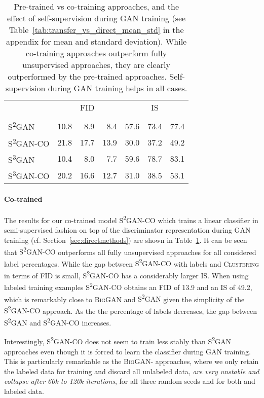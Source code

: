 \documentclass{article}
\newcommand{\cotrainSS}{\textsc{S\textsuperscript{2}GAN-CO}}
\newcommand{\cotrainSSS}{\textsc{S\textsuperscript{3}GAN-CO}}
\newcommand{\tranSS}{\textsc{S\textsuperscript{2}GAN}}
\newcommand{\tranSSS}{\textsc{S\textsuperscript{3}GAN}}
\newcommand{\tranC}{\textsc{Clustering}}
\newcommand{\biggan}{\textsc{BigGAN}}
\begin{document}
\begin{table}[h]
\caption{Pre-trained vs co-training approaches, and the effect of self-supervision during GAN training (see Table~\ref{tab:transfer_vs_direct_mean_std} in the appendix for mean and standard deviation). While co-training approaches outperform fully unsupervised approaches, they are clearly outperformed by the pre-trained approaches. Self-supervision during GAN training helps in all cases.\vspace{0.2cm}}
\centering
\setlength\tabcolsep{4.5pt}
\begin{tabular}{lrrrrrr}
\toprule
&\multicolumn{3}{c}{\textsc{FID}} & \multicolumn{3}{c}{\textsc{IS}}\\\cmidrule(lr){2-4}\cmidrule(lr){5-7}
&         &   &    &    &   &    \\
\midrule
\tranSS{}       &           10.8 &   8.9 &   8.4 &  57.6 &  73.4 &  77.4 \\
\cotrainSS	    &           21.8 &  17.7 &  13.9 &  30.0 &  37.2 &  49.2 \\\midrule
\tranSSS{}      &           10.4 &   8.0 &   7.7 &  59.6 &  78.7 &  83.1 \\
\cotrainSSS	    &           20.2 &  16.6 &  12.7 &  31.0 &  38.5 &  53.1 \\
\bottomrule
\end{tabular} \label{tab:transfer_vs_direct}
\end{table}


\paragraph{Co-trained}

The results for our co-trained model \cotrainSS{} which trains a linear classifier in semi-supervised fashion on top of the discriminator representation during GAN training (cf. Section~\ref{sec:directmethods}) are shown in Table~\ref{tab:transfer_vs_direct}. It can be seen that \cotrainSS{} outperforms all fully unsupervised approaches for all considered label percentages. While the gap between \cotrainSS{} with  labels and \tranC{} in terms of FID is small, \cotrainSS{} has a considerably larger IS. When using  labeled training examples \cotrainSS{} obtains an FID of 13.9 and an IS of 49.2, which is remarkably close to \biggan{} and \tranSS{} given the simplicity of the \cotrainSS{} approach. As the the percentage of labels decreases, the gap between \tranSS{} and \cotrainSS{} increases. 

Interestingly, \cotrainSS{} does not seem to train less stably than \tranSS{} approaches even though it is forced to learn the classifier during GAN training. This is particularly remarkable as the \biggan{}- approaches, where we only retain the labeled data for training and discard all unlabeled data, \emph{are very unstable and collapse after 60k to 120k iterations}, for all three random seeds and for both  and  labeled data.
\end{document}
